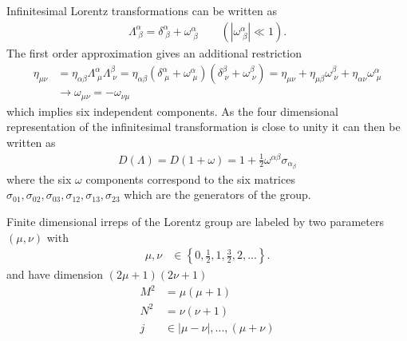 \documentclass[10pt,a4paper]{article}
\theoremstyle{definition}
\begin{document}
Infinitesimal Lorentz transformations can be written as
\begin{align}
    \Lambda^\alpha_{\;\beta}=\delta^\alpha_{\;\beta}+\omega^\alpha_{\;\beta}\qquad(|\omega^\alpha_{\;\beta}|\ll 1).
\end{align}
The first order approximation gives an additional restriction
\begin{align}
    \eta_{\mu\nu} &= \eta_{\alpha\beta}\Lambda^\alpha_{\;\mu}\Lambda^\beta_{\;\nu}=\eta_{\alpha\beta}(\delta^\alpha_{\;\mu}+\omega^\alpha_{\;\mu})(\delta^\beta_{\;\nu}+\omega^\beta_{\;\nu})=\eta_{\mu\nu}+\eta_{\mu\beta}\omega^\beta_{\;\nu}+\eta_{\alpha\nu}\omega^\alpha_{\;\mu}\\
    &\rightarrow \omega_{\mu\nu}=-\omega_{\nu\mu}
\end{align}
which implies six independent components. As the four dimensional representation of the infinitesimal transformation is close to unity it can then be written as
\begin{align}
    D(\Lambda)=D(1+\omega)=1+\frac{1}{2}\omega^{\alpha\beta}\sigma_{\alpha_\beta}
\end{align}
where the six $\omega$ components correspond to the six matrices $\sigma_{01},\sigma_{02},\sigma_{03},\sigma_{12},\sigma_{13},\sigma_{23}$ which are the generators of the group.


Finite dimensional irreps of the Lorentz group are labeled by two parameters $(\mu,\nu)$ with
\begin{align}
    \mu,\nu &\in \left\{0,\frac{1}{2},1,\frac{3}{2},2,...\right\}.
\end{align}
and have dimension $(2\mu+1)(2\nu+1)$
\begin{align*}
    M^2&=\mu(\mu+1)\\
    N^2&=\nu(\nu+1)\\
    j  &\in |\mu-\nu|, ..., (\mu+\nu)
\end{align*}
\end{document}
